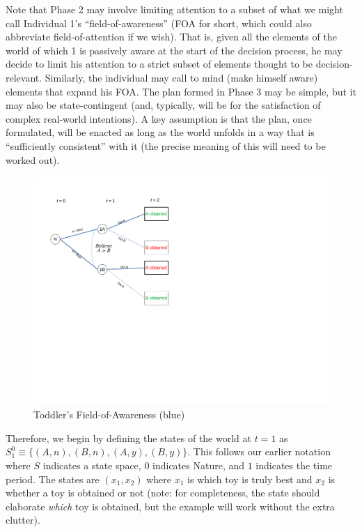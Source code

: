 \documentclass[
11pt,
titlepage,
reqno,
]{article}%
\theoremstyle{definition}
\begin{document}
Note that Phase 2 may involve limiting attention to a subset of what we might call Individual 1's ``field-of-awareness'' (FOA for short, which could also abbreviate field-of-attention if we wish). That is, given all the elements of the world of which 1 is passively aware at the start of the decision process, he may decide to limit his attention to a strict subset of elements thought to be  decision-relevant. Similarly, the individual may call to mind (make himself aware) elements that expand his FOA. The plan formed in Phase 3 may be simple, but it may also be state-contingent (and, typically, will be for the satisfaction of complex real-world intentions). A key assumption is that the plan, once formulated, will be enacted as long as the world unfolds in a way that is ``sufficiently consistent'' with it (the precise meaning of this will need to be worked out). 

\begin{figure}[h!]
	\centering
	\includegraphics*[page=3,trim = 0in 4.5in 8in .5in,scale=1]{Awareness_Diagrams_All}
	\caption{Toddler's Field-of-Awareness (blue)\label{Diag: p-03}}%
\end{figure}

Therefore, we begin by defining the states of the world at $t=1$ as $S^0_1\equiv \{(A,n),(B,n),(A,y),(B,y)\}$. This follows our earlier notation where $S$ indicates a state space, $0$ indicates Nature, and $1$ indicates the time period. The states are $(x_1,x_2)$ where $x_1$ is which toy is truly best and $x_2$ is whether a toy is obtained or not (note: for completeness, the state should elaborate \textit{which} toy is obtained, but the example will work without the extra clutter). 
\end{document}
